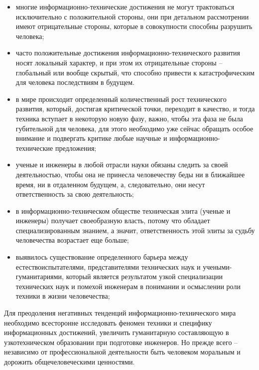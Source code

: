 \begin{itemize}
  
\item{многие информационно-технические достижения не могут трактоваться исключительно с положительной стороны, они при детальном рассмотрении имеют отрицательные стороны, которые в совокупности способны разрушить человека;}
  
\item{часто положительные достижения информационно-технического развития носят локальный характер, и при этом их отрицательные стороны – глобальный или вообще скрытый, что способно привести к катастрофическим для человека последствиям в будущем.}
  
\item{в мире происходит определенный количественный рост технического развития, который, достигая критической точки, переходит в качество, и тогда техника вступает в некоторую новую фазу, важно, чтобы эта фаза не была губительной для человека, для этого необходимо уже сейчас обращать особое внимание и подвергать критике любые научные и информационно-технические предложения;}
  
\item{ученые и инженеры в любой отрасли науки обязаны следить за своей деятельностью, чтобы она не принесла человечеству беды ни в ближайшее время, ни в отдаленном будущем, а, следовательно, они несут ответственность за свою деятельность;}
  
\item{в информационно-техническом обществе техническая элита (ученые и инженеры) получает своеобразную власть, потому что обладает специализированным знанием, а значит, ответственность этой элиты за судьбу человечества возрастает еще больше;}
  
\item{выявилось существование определенного барьера между естествоиспытателями, представителями технических наук и учеными-гуманитариями, который является результатом узкой специализации технических наук и помехой инженерам в понимании и осмыслении роли техники в жизни человечества;}
  
\end{itemize}

Для преодоления негативных тенденций информационно-технического мира необходимо всесторонне исследовать феномен техники и специфику информационных достижений, увеличить гуманитарную составляющую в узкотехническом образовании при подготовке инженеров. Но прежде всего – независимо от профессиональной деятельности быть человеком моральным и дорожить общечеловеческими ценностями.
